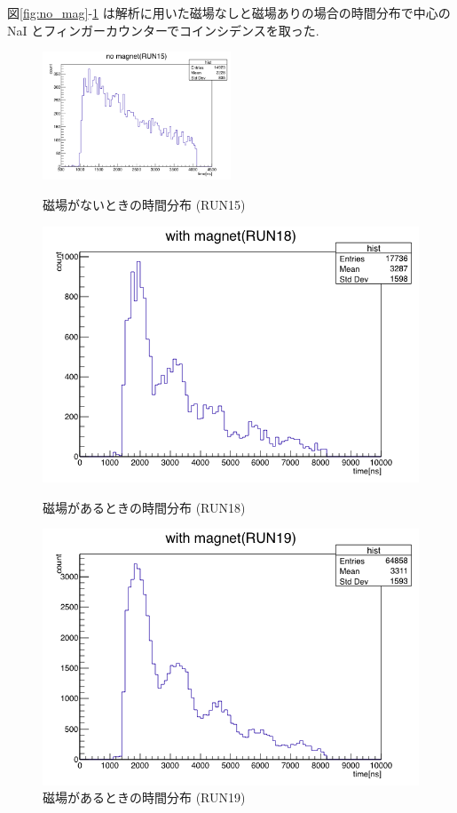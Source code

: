 図\ref{fig:no_mag}-\ref{fig:with_mag_RUN19} は解析に用いた磁場なしと磁場ありの場合の時間分布で中心のNaI とフィンガーカウンターでコインシデンスを取った.
\begin{figure}[H]
\centering
\includegraphics[width  = 0.5\textwidth]{figure/mino/no_mag.png}
\caption{磁場がないときの時間分布 (RUN15)}
\label{fig:no_mag}
\begin{minipage}{0.45\hsize}
\centering
\includegraphics[width  = 1.0\textwidth]{figure/mino/with_mag_RUN18.png}
\caption{磁場があるときの時間分布 (RUN18)}
\end{minipage}
\begin{minipage}{0.45\hsize}
\centering
\includegraphics[width  = 1.0\textwidth]{figure/mino/with_mag_RUN19.png}
\caption{磁場があるときの時間分布 (RUN19)}
\label{fig:with_mag_RUN19}
\end{minipage}
\end{figure}

